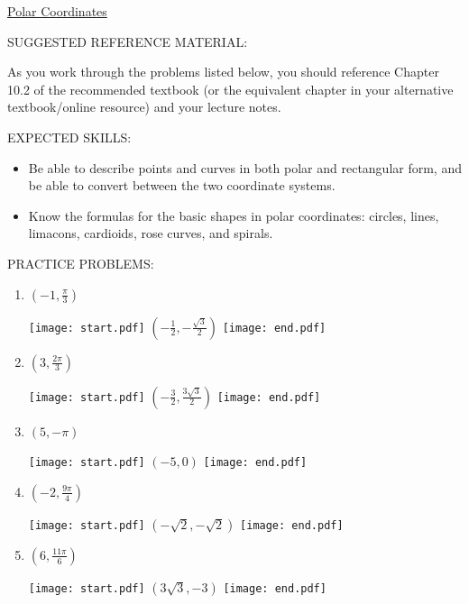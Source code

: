 \documentclass[12pt]{article}
\begin{document}
\begin{center}
\underline{\LARGE{Polar Coordinates}}
\end{center}

\noindent SUGGESTED REFERENCE MATERIAL:

\bigskip

\noindent As you work through the problems listed below, you should reference Chapter 10.2 of the recommended textbook (or the equivalent chapter in your alternative textbook/online resource) and your lecture notes.

\bigskip

\noindent EXPECTED SKILLS:

\begin{itemize}

\item Be able to describe points and curves in both polar and rectangular form, and be able to convert between the two coordinate systems. 

\item Know the formulas for the basic shapes in polar coordinates: circles, lines, limacons, cardioids, rose curves,
and spirals.

\end{itemize}

\noindent PRACTICE PROBLEMS:

\medskip


\begin{enumerate}

\item $\left(-1, \frac{\pi}{3}\right)$ 

\texttt{[image: start.pdf]}
{{$\left(-\frac{1}{2},-\frac{\sqrt{3}}{2}\right)$}}
\texttt{[image: end.pdf]}


\item $\left(3, \frac{2\pi}{3}\right)$ 

\texttt{[image: start.pdf]}
{{$\left(-\frac{3}{2},\frac{3\sqrt{3}}{2}\right)$}}
\texttt{[image: end.pdf]}


\item $(5, -\pi)$ 

\texttt{[image: start.pdf]}
{{$(-5,0)$}}
\texttt{[image: end.pdf]}


\item $\left(-2, \frac{9\pi}{4}\right)$ 

\texttt{[image: start.pdf]}
{{$\left(-\sqrt{2},-\sqrt{2}\right)$}}
\texttt{[image: end.pdf]}


\item $\left(6, \frac{11\pi}{6}\right)$ 

\texttt{[image: start.pdf]}
{{$\left(3\sqrt{3},-3\right)$}}
\texttt{[image: end.pdf]}


\end{enumerate}
\end{document}
